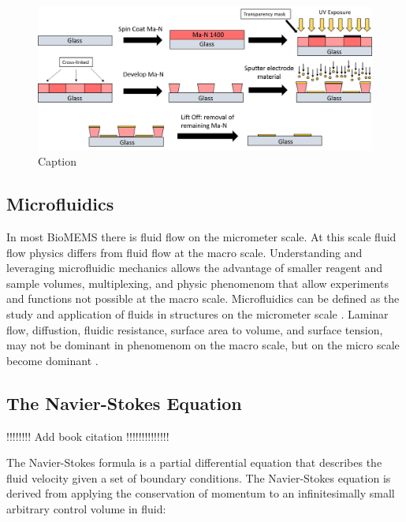  \begin{figure}
     \centering
     \includegraphics[width=\textwidth]{images/electrodeFabrication.png}
     \caption{Caption}
     \label{fig:lift_off}
 \end{figure}
 
 
 \subsection{Microfluidics}
 
\par In most BioMEMS there is fluid flow on the micrometer scale. At this scale fluid flow physics differs from fluid flow at the macro scale. Understanding and leveraging microfluidic mechanics allows the advantage of smaller reagent and sample volumes, multiplexing, and physic phenomenom that allow experiments and functions not possible at the macro scale. Microfluidics can be defined as the study and application of fluids in structures on the micrometer scale \cite{pamb}. Laminar flow, diffustion, fluidic resistance, surface area to volume, and surface tension, may not be dominant in phenomenom on the macro scale, but on the micro scale become dominant \cite{pamb-12}. 

\subsection*{The Navier-Stokes Equation}

\par !!!!!!!! Add book citation !!!!!!!!!!!!!!

\par The Navier-Stokes formula is a partial differential equation that describes the fluid velocity given a set of boundary conditions. The Navier-Stokes equation is derived from applying the conservation of momentum to an infinitesimally small arbitrary control volume in fluid:

